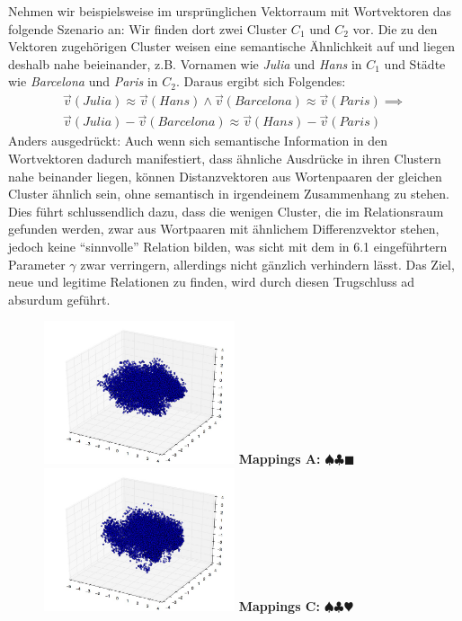 \begin{itemize}
  Nehmen wir beispielsweise im ursprünglichen Vektorraum mit Wortvektoren das folgende Szenario an: Wir finden dort
  zwei Cluster $C_1$ und $C_2$ vor. Die zu den Vektoren zugehörigen Cluster weisen eine semantische Ähnlichkeit auf
  und liegen deshalb nahe beieinander, z.B. Vornamen wie \emph{Julia} und \emph{Hans} in $C_1$ und Städte wie
  \emph{Barcelona} und \emph{Paris} in $C_2$. Daraus ergibt sich Folgendes:
  \begin{equation}
    \begin{split}
      \vec{v}(Julia) \approx \vec{v}(Hans) \land \vec{v}(Barcelona) \approx \vec{v}(Paris) \implies \\
      \vec{v}(Julia) - \vec{v}(Barcelona) \approx \vec{v}(Hans) - \vec{v}(Paris)
    \end{split}
  \end{equation}
  Anders ausgedrückt: Auch wenn sich semantische Information in den Wortvektoren dadurch manifestiert, dass ähnliche
  Ausdrücke in ihren Clustern nahe beinander liegen, können Distanzvektoren aus Wortenpaaren der gleichen Cluster ähnlich sein,
  ohne semantisch in irgendeinem Zusammenhang zu stehen. Dies führt schlussendlich dazu, dass die wenigen Cluster, die
  im Relationsraum gefunden werden, zwar aus Wortpaaren mit ähnlichem Differenzvektor stehen, jedoch keine ``sinnvolle''
  Relation bilden, was sicht mit dem in 6.1 eingeführtern Parameter $\gamma$ zwar verringern, allerdings nicht gänzlich
  verhindern lässt. Das Ziel, neue und legitime Relationen zu finden, wird durch diesen Trugschluss ad absurdum geführt.

\begin{figure}[h]
  \centering
  \begin{multicols}{2}
    \includegraphics[width=0.5\textwidth]{../img/mappings_get10000_occ100_cos.jpg}
    \textbf{Mappings A:} $\spadesuit\clubsuit\blacksquare$
    \includegraphics[width=0.5\textwidth]{../img/mappings_get10000_occ100_eucl.jpg}
    \textbf{Mappings C:} $\spadesuit\clubsuit\varheart$


\end{multicols}
\end{figure}
\end{itemize}
